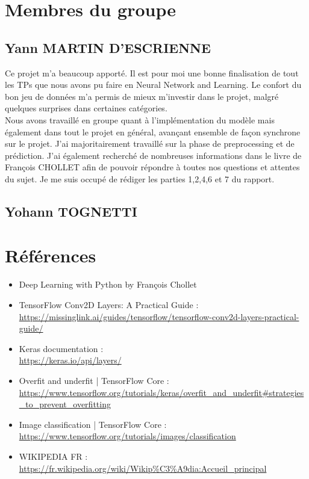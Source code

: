 \documentclass[12pt ,a4paper ]{article}
\begin{document}
\section{Membres du groupe}
\subsection{Yann MARTIN D'ESCRIENNE}
Ce projet m'a beaucoup apporté. Il est pour moi une bonne finalisation de tout les TPs que nous avons pu faire en Neural Network and Learning. Le confort du bon jeu de données m'a permis de mieux m'investir dans le projet, malgré quelques surprises dans certaines catégories.\\

Nous avons travaillé en groupe quant à l'implémentation du modèle mais également dans tout le projet en général, avançant ensemble de façon synchrone sur le projet. J'ai majoritairement travaillé sur la phase de preprocessing et de prédiction. J'ai également recherché de nombreuses informations dans le livre de François CHOLLET afin de pouvoir répondre à toutes nos questions et attentes du sujet. 
Je me suis occupé de rédiger les parties 1,2,4,6 et 7 du rapport. 

\subsection{Yohann TOGNETTI}

\section{Références}
\begin{itemize}
\item Deep Learning with Python by François Chollet 
\item TensorFlow Conv2D Layers: A Practical Guide :\\ \url{https://missinglink.ai/guides/tensorflow/tensorflow-conv2d-layers-practical-guide/}%
\item Keras documentation :\\ \url{https://keras.io/api/layers/}%
\item Overfit and underfit  |  TensorFlow Core :\\ \url{https://www.tensorflow.org/tutorials/keras/overfit_and_underfit#strategies_to_prevent_overfitting}%
\item Image classification  |  TensorFlow Core :\\ \url{https://www.tensorflow.org/tutorials/images/classification}%
\item WIKIPEDIA FR :\\ \url{https://fr.wikipedia.org/wiki/Wikip%C3%A9dia:Accueil_principal}%
\end{itemize}
\end{document}

